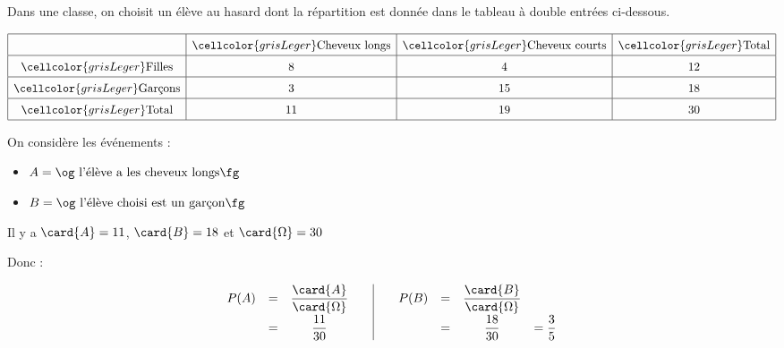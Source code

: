 
Dans une classe, on choisit un élève au hasard dont la répartition est donnée dans le tableau à double entrées ci-dessous.

$$
	\def\arraystretch{1.5}
	\begin{array}{|c|c|c|c|} \hline
		                                    & \cellcolor{grisLeger}\text{Cheveux longs} & \cellcolor{grisLeger}\text{Cheveux courts} & \cellcolor{grisLeger}\text{Total} \\ \hline
		\cellcolor{grisLeger}\text{Filles}  & 8                                         & 4                                          & 12                                \\ \hline
		\cellcolor{grisLeger}\text{Garçons} & 3                                         & 15                                         & 18                                \\ \hline
		\cellcolor{grisLeger}\text{Total}   & 11                                        & 19                                         & 30                                \\ \hline
	\end{array}
$$

\ms

On considère les événements :

\begin{itemize}
	\item $A=\text{\og l'élève a les cheveux longs\fg}$
	\item $B=\text{\og l'élève choisi est un garçon\fg}$
\end{itemize}

Il y a $\card{A}=11$, $\card{B}=18$ et $\card{\Omega}=30$

Donc :

$$
	\begin{array}{cc|cc}
		\def\arraystretch{1.7}
		\begin{array}{rcc}
			P(A) & = & \dfrac{\card{A}}{\card{\Omega}} \\
			     & = & \dfrac{11}{30}
		\end{array}
		 & \null & \null &
		\def\arraystretch{1.7}
		\begin{array}{rccc}
			P(B) & = & \dfrac{\card{B}}{\card{\Omega}} &               \\
			     & = & \dfrac{18}{30}                  & =\dfrac{3}{5}
		\end{array}
	\end{array}
$$

